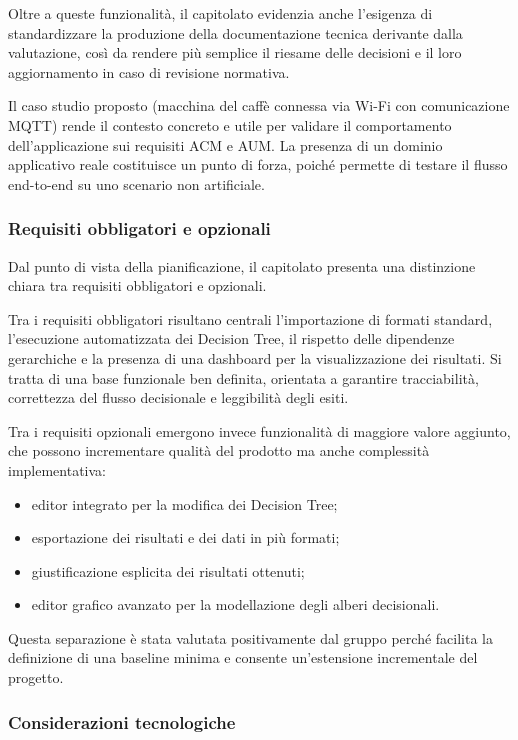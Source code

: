 \documentclass[a4paper,12pt]{article}
\begin{document}
Oltre a queste funzionalità, il capitolato evidenzia anche l'esigenza di standardizzare la produzione della documentazione tecnica derivante dalla valutazione, così da rendere più semplice il riesame delle decisioni e il loro aggiornamento in caso di revisione normativa.

Il caso studio proposto (macchina del caffè connessa via Wi-Fi con comunicazione MQTT) rende il contesto concreto e utile per validare il comportamento dell'applicazione sui requisiti ACM e AUM. La presenza di un dominio applicativo reale costituisce un punto di forza, poiché permette di testare il flusso end-to-end su uno scenario non artificiale.

\subsubsection{Requisiti obbligatori e opzionali}

Dal punto di vista della pianificazione, il capitolato presenta una distinzione chiara tra requisiti obbligatori e opzionali.

Tra i requisiti obbligatori risultano centrali l'importazione di formati standard, l'esecuzione automatizzata dei Decision Tree, il rispetto delle dipendenze gerarchiche e la presenza di una dashboard per la visualizzazione dei risultati. Si tratta di una base funzionale ben definita, orientata a garantire tracciabilità, correttezza del flusso decisionale e leggibilità degli esiti.

Tra i requisiti opzionali emergono invece funzionalità di maggiore valore aggiunto, che possono incrementare qualità del prodotto ma anche complessità implementativa:

\begin{itemize}
    \item editor integrato per la modifica dei Decision Tree;
    \item esportazione dei risultati e dei dati in più formati;
    \item giustificazione esplicita dei risultati ottenuti;
    \item editor grafico avanzato per la modellazione degli alberi decisionali.
\end{itemize}

Questa separazione è stata valutata positivamente dal gruppo perché facilita la definizione di una baseline minima e consente un'estensione incrementale del progetto.

\subsubsection{Considerazioni tecnologiche}
\end{document}
